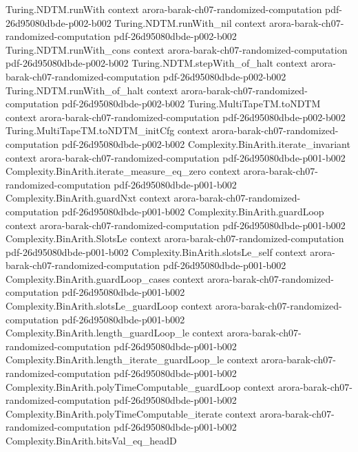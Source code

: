 \begin{theorem}
\proofstep
  {Turing.NDTM.runWith}
  {context}
  {arora-barak-ch07-randomized-computation}
  {pdf-26d95080dbde-p002-b002}
\proofstep
  {Turing.NDTM.runWith_nil}
  {context}
  {arora-barak-ch07-randomized-computation}
  {pdf-26d95080dbde-p002-b002}
\proofstep
  {Turing.NDTM.runWith_cons}
  {context}
  {arora-barak-ch07-randomized-computation}
  {pdf-26d95080dbde-p002-b002}
\proofstep
  {Turing.NDTM.stepWith_of_halt}
  {context}
  {arora-barak-ch07-randomized-computation}
  {pdf-26d95080dbde-p002-b002}
\proofstep
  {Turing.NDTM.runWith_of_halt}
  {context}
  {arora-barak-ch07-randomized-computation}
  {pdf-26d95080dbde-p002-b002}
\proofstep
  {Turing.MultiTapeTM.toNDTM}
  {context}
  {arora-barak-ch07-randomized-computation}
  {pdf-26d95080dbde-p002-b002}
\proofstep
  {Turing.MultiTapeTM.toNDTM_initCfg}
  {context}
  {arora-barak-ch07-randomized-computation}
  {pdf-26d95080dbde-p002-b002}
\proofstep
  {Complexity.BinArith.iterate_invariant}
  {context}
  {arora-barak-ch07-randomized-computation}
  {pdf-26d95080dbde-p001-b002}
\proofstep
  {Complexity.BinArith.iterate_measure_eq_zero}
  {context}
  {arora-barak-ch07-randomized-computation}
  {pdf-26d95080dbde-p001-b002}
\proofstep
  {Complexity.BinArith.guardNxt}
  {context}
  {arora-barak-ch07-randomized-computation}
  {pdf-26d95080dbde-p001-b002}
\proofstep
  {Complexity.BinArith.guardLoop}
  {context}
  {arora-barak-ch07-randomized-computation}
  {pdf-26d95080dbde-p001-b002}
\proofstep
  {Complexity.BinArith.SlotsLe}
  {context}
  {arora-barak-ch07-randomized-computation}
  {pdf-26d95080dbde-p001-b002}
\proofstep
  {Complexity.BinArith.slotsLe_self}
  {context}
  {arora-barak-ch07-randomized-computation}
  {pdf-26d95080dbde-p001-b002}
\proofstep
  {Complexity.BinArith.guardLoop_cases}
  {context}
  {arora-barak-ch07-randomized-computation}
  {pdf-26d95080dbde-p001-b002}
\proofstep
  {Complexity.BinArith.slotsLe_guardLoop}
  {context}
  {arora-barak-ch07-randomized-computation}
  {pdf-26d95080dbde-p001-b002}
\proofstep
  {Complexity.BinArith.length_guardLoop_le}
  {context}
  {arora-barak-ch07-randomized-computation}
  {pdf-26d95080dbde-p001-b002}
\proofstep
  {Complexity.BinArith.length_iterate_guardLoop_le}
  {context}
  {arora-barak-ch07-randomized-computation}
  {pdf-26d95080dbde-p001-b002}
\proofstep
  {Complexity.BinArith.polyTimeComputable_guardLoop}
  {context}
  {arora-barak-ch07-randomized-computation}
  {pdf-26d95080dbde-p001-b002}
\proofstep
  {Complexity.BinArith.polyTimeComputable_iterate}
  {context}
  {arora-barak-ch07-randomized-computation}
  {pdf-26d95080dbde-p001-b002}
\proofstep
  {Complexity.BinArith.bitsVal_eq_headD}

\end{theorem}
